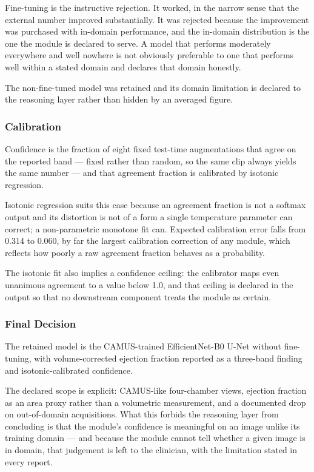 Fine-tuning is the instructive rejection. It worked, in the narrow sense that the external
number improved substantially. It was rejected because the improvement was purchased with
in-domain performance, and the in-domain distribution is the one the module is declared to
serve. A model that performs moderately everywhere and well nowhere is not obviously preferable
to one that performs well within a stated domain and declares that domain honestly.

The non-fine-tuned model was retained and its domain limitation is declared to the reasoning
layer rather than hidden by an averaged figure.

\subsubsection{Calibration}

Confidence is the fraction of eight fixed test-time augmentations that agree on the reported
band --- fixed rather than random, so the same clip always yields the same number --- and that
agreement fraction is calibrated by isotonic regression.

Isotonic regression suits this case because an agreement fraction is not a softmax output and
its distortion is not of a form a single temperature parameter can correct; a non-parametric
monotone fit can. Expected calibration error falls from 0.314 to 0.060, by far the largest
calibration correction of any module, which reflects how poorly a raw agreement fraction
behaves as a probability.

The isotonic fit also implies a confidence ceiling: the calibrator maps even unanimous
agreement to a value below 1.0, and that ceiling is declared in the output so that no
downstream component treats the module as certain.

\subsubsection{Final Decision}

The retained model is the CAMUS-trained EfficientNet-B0 U-Net without fine-tuning, with
volume-corrected ejection fraction reported as a three-band finding and isotonic-calibrated
confidence.

The declared scope is explicit: CAMUS-like four-chamber views, ejection fraction as an area
proxy rather than a volumetric measurement, and a documented drop on out-of-domain
acquisitions. What this forbids the reasoning layer from concluding is that the module's
confidence is meaningful on an image unlike its training domain --- and because the module
cannot tell whether a given image is in domain, that judgement is left to the clinician, with
the limitation stated in every report.

